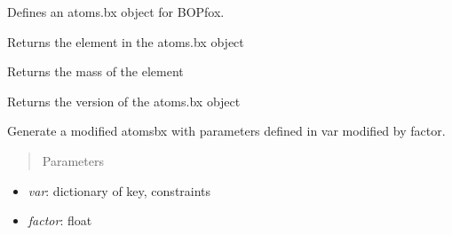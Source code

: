 \documentclass[letterpaper,10pt,english]{sphinxmanual}
\begin{document}
\begin{fulllineitems}
\label{classes:bopmodel.atomsbx}
Defines an atoms.bx object for BOPfox.

\begin{fulllineitems}
\label{classes:bopmodel.atomsbx.get_atom}
Returns the element in the atoms.bx object

\end{fulllineitems}


\begin{fulllineitems}
\label{classes:bopmodel.atomsbx.get_mass}
Returns the mass of the element

\end{fulllineitems}


\begin{fulllineitems}
\label{classes:bopmodel.atomsbx.get_version}
Returns the version of the atoms.bx object

\end{fulllineitems}


\begin{fulllineitems}
\label{classes:bopmodel.atomsbx.rattle}
Generate a modified atomsbx with parameters defined in var modified 
by factor.
\begin{quote}\begin{description}
\item[{Parameters}] \leavevmode
\end{description}\end{quote}
\begin{itemize}
\item {} 
\emph{var}: dictionary of key, constraints

\item {} 
\emph{factor}: float

\end{itemize}


\end{fulllineitems}
\end{fulllineitems}
\end{document}
